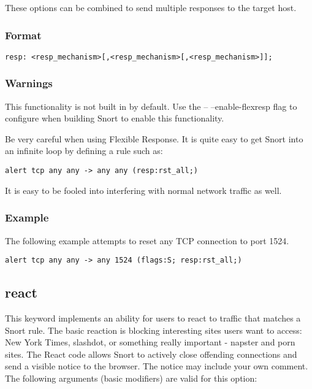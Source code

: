\documentclass[english]{report}
\begin{document}
These options can be combined to send multiple responses to the target host.

\subsubsection{Format}

\begin{verbatim}
resp: <resp_mechanism>[,<resp_mechanism>[,<resp_mechanism>]];
\end{verbatim}

\subsubsection{Warnings}

This functionality is not built in by default.  Use the -- --enable-flexresp flag
to configure when building Snort to enable this functionality.

Be very careful when using Flexible Response. It is quite easy to get Snort
into an infinite loop by defining a rule such as:

\begin{verbatim}
alert tcp any any -> any any (resp:rst_all;)
\end{verbatim}

It is easy to be fooled into interfering with normal network traffic as well.

\subsubsection{Example}

The following example attempts to reset any TCP connection to port 1524.
\begin{verbatim}
alert tcp any any -> any 1524 (flags:S; resp:rst_all;)
\end{verbatim}


\subsection{react}

This keyword implements an ability for users to react to traffic that
matches a Snort rule. The basic reaction is blocking interesting sites
users want to access: New York Times, slashdot, or something really
important - napster and porn sites. The React code allows Snort to
actively close offending connections and send a visible notice to the
browser. The notice may include your own comment. The following arguments
(basic modifiers) are valid for this option:
\end{document}
